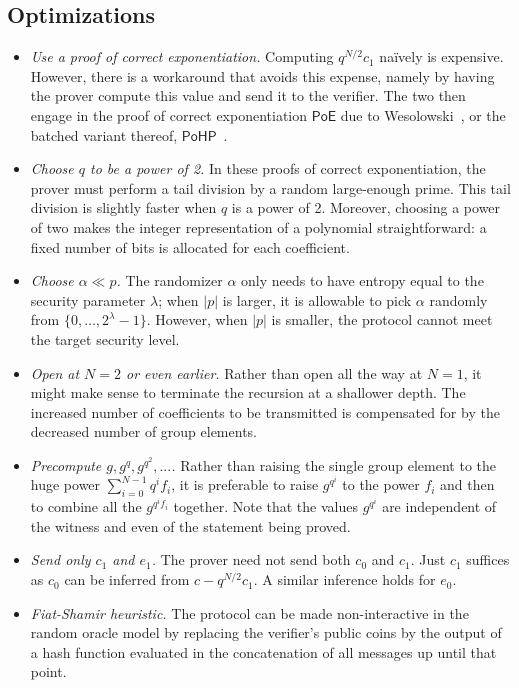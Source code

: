 \documentclass[10pt]{llncs}
\begin{document}
\subsection{Optimizations}
\begin{itemize}
    \item \textit{Use a proof of correct exponentiation.} Computing $q^{N/2}c_1$ naïvely is expensive. However, there is a workaround that avoids this expense, namely by having the prover compute this value and send it to the verifier. The two then engage in the proof of correct exponentiation $\mathsf{PoE}$ due to Wesolowski~\cite{conf/eurocrypt/Wesolowski19}, or the batched variant thereof, $\mathsf{PoHP}$~\cite{journals/iacr/BonehBF18a}.
    \item \textit{Choose $q$ to be a power of 2.} In these proofs of correct exponentiation, the prover must perform a tail division by a random large-enough prime. This tail division is slightly faster when $q$ is a power of 2. Moreover, choosing a power of two makes the integer representation of a polynomial straightforward: a fixed number of bits is allocated for each coefficient.
    \item \textit{Choose $\alpha \ll p$.} The randomizer $\alpha$ only needs to have entropy equal to the security parameter $\lambda$; when $|p|$ is larger, it is allowable to pick $\alpha$ randomly from $\{0, \ldots, 2^\lambda-1\}$. However, when $|p|$ is smaller, the protocol cannot meet the target security level.
    \item \textit{Open at $N = 2$ or even earlier.} Rather than open all the way at $N=1$, it might make sense to terminate the recursion at a shallower depth. The increased number of coefficients to be transmitted is compensated for by the decreased number of group elements.
    \item \textit{Precompute $g, g^q, g^{q^2}, ...$.} Rather than raising the single group element to the huge power $\sum_{i=0}^{N-1}q^if_i$, it is preferable to raise $g^{q^i}$ to the power $f_i$ and then to combine all the $g^{q^if_i}$ together. Note that the values $g^{q^i}$ are independent of the witness and even of the statement being proved.
    \item \textit{Send only $c_1$ and $e_1$.} The prover need not send both $c_0$ and $c_1$. Just $c_1$ suffices as $c_0$ can be inferred from $c - q^{N/2}c_1$. A similar inference holds for $e_0$.
    \item \textit{Fiat-Shamir heuristic.} The protocol can be made non-interactive in the random oracle model by replacing the verifier's public coins by the output of a hash function evaluated in the concatenation of all messages up until that point.
\end{itemize}
\end{document}
